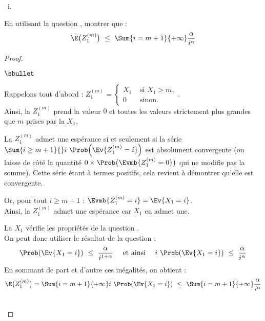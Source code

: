\documentclass[11pt]{article}%
\begin{document}
\begin{liste}{\ i.}
\item En utilisant la question , montrer que :
  \[
  \E\big(Z_{1}^{(m)} \big) \ \leq \ \Sum{i = m + 1}{+ \infty}
  \dfrac{\alpha}{i^{\alpha}}
  \]
  
  \begin{proof}~%
    \begin{noliste}{$\sbullet$}
    \item Rappelons tout d'abord : $Z_{1}^{(m)} = %
      \left\{
        \begin{array}{cl}
          X_{1} & \text{ si } X_{1} > m, \\
          0 & \text{ sinon}.
        \end{array}
      \right.$.\\
      Ainsi, la \var $Z_{1}^{(m)}$ prend la valeur $0$ et toutes les
      valeurs strictement plus grandes que $m$ prises par la \var
      $X_1$. %

    \item La \var $Z_{1}^{(m)}$ admet une espérance si et seulement si
      la série $\Sum{i \geq m+1}{} i \ \Prob\Big(\Ev{Z_{1}^{(m)} = i}
      \Big)$ est absolument convergente (on laisse de côté la quantité
      $0 \times \Prob\big(\Evmb{Z_{1}^{(m)} = 0}\big)$ qui ne modifie pas la
      somme). Cette série étant à termes positifs, cela revient à
      démontrer qu'elle est convergente.

    \item Or, pour tout $i \geq m+1$ : $\Evmb{Z_{1}^{(m)} = i} =
      \Ev{X_1 = i}$.\\
      Ainsi, la \var $Z_{1}^{(m)}$ admet une espérance car $X_1$ en
      admet une.

    \item La \var $X_1$ vérifie les propriétés de la question
      .\\
      On peut donc utiliser le résultat de la question 
      :
      \[
      \Prob(\Ev{X_1 = i}) \ \leq \ \dfrac{\alpha}{i^{1+\alpha}} \quad
      \text{ et ainsi } \quad i \ \Prob(\Ev{X_1 = i}) \ \leq \
      \dfrac{\alpha}{i^{\alpha}}
      \]
      En sommant de part et d'autre ces inégalités, on obtient :
      \[
      \E\big(Z_{1}^{(m)} \big) = \Sum{i = m+1}{+\infty} i \
      \Prob(\Ev{X_1 = i}) \ \leq \ \Sum{i = m+1}{+\infty}
      \dfrac{\alpha}{i^{\alpha}}
      \]
    \end{noliste}
    ~\\[-1cm]
  \end{proof}



\end{liste}
\end{document}
